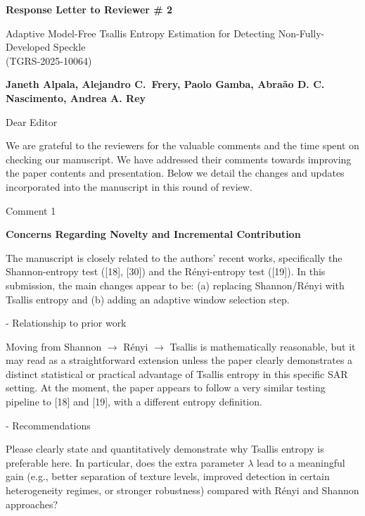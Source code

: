 \documentclass[11pt]{report}
\begin{document}
\begin{center}
\large{\textbf{Response Letter to Reviewer \# 2}}

\vglue 0.3cm

\huge{ Adaptive Model-Free Tsallis Entropy Estimation for Detecting Non-Fully-Developed Speckle\\ (TGRS-2025-10064)}
\end{center}

\begin{center}
\textbf{Janeth Alpala,  Alejandro C.\ Frery, Paolo Gamba, Abraão D. C. Nascimento, Andrea A. Rey }
\end{center}

\date{\today}


\vspace{0.5cm}
\noindent Dear Editor
\bigskip

\noindent We are grateful to the reviewers for the valuable comments and the time spent on checking our manuscript. 
We have addressed their comments towards improving the paper contents and presentation. 
Below we detail the changes and updates incorporated into the manuscript in this round of review.

\medskip



\vspace{0.5cm}

\begin{reviewbox}{Comment 1}

\textbf{Concerns Regarding Novelty and Incremental Contribution}

The manuscript is closely related to the authors' recent works, specifically the Shannon-entropy test ([18], [30]) and the Rényi-entropy test ([19]). In this submission, the main changes appear to be: (a) replacing Shannon/Rényi with Tsallis entropy and (b) adding an adaptive window selection step.

- Relationship to prior work

Moving from Shannon $\rightarrow$ Rényi $\rightarrow$ Tsallis is mathematically reasonable, but it may read as a straightforward extension unless the paper clearly demonstrates a distinct statistical or practical advantage of Tsallis entropy in this specific SAR setting. At the moment, the paper appears to follow a very similar testing pipeline to [18] and [19], with a different entropy definition.

- Recommendations

Please clearly state and quantitatively demonstrate why Tsallis entropy is preferable here. In particular, does the extra parameter $\lambda$ lead to a meaningful gain (e.g., better separation of texture levels, improved detection in certain heterogeneity regimes, or stronger robustness) compared with Rényi and Shannon approaches?

\end{reviewbox}
\end{document}
